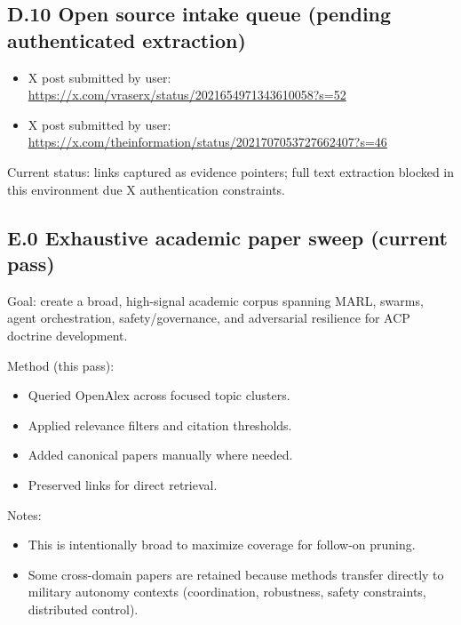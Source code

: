 \documentclass[
]{article}
\providecommand{\tightlist}{%
  \setlength{\itemsep}{0pt}\setlength{\parskip}{0pt}}
\begin{document}
\hypertarget{d.10-open-source-intake-queue-pending-authenticated-extraction}{%
\subsection{D.10 Open source intake queue (pending authenticated
extraction)}\label{d.10-open-source-intake-queue-pending-authenticated-extraction}}

\begin{itemize}
\tightlist
\item
  X post submitted by user:
  \url{https://x.com/vraserx/status/2021654971343610058?s=52}
\item
  X post submitted by user:
  \url{https://x.com/theinformation/status/2021707053727662407?s=46}
\end{itemize}

Current status: links captured as evidence pointers; full text
extraction blocked in this environment due X authentication constraints.

\hypertarget{e.0-exhaustive-academic-paper-sweep-current-pass}{%
\subsection{E.0 Exhaustive academic paper sweep (current
pass)}\label{e.0-exhaustive-academic-paper-sweep-current-pass}}

Goal: create a broad, high-signal academic corpus spanning MARL, swarms,
agent orchestration, safety/governance, and adversarial resilience for
ACP doctrine development.

Method (this pass):

\begin{itemize}
\tightlist
\item
  Queried OpenAlex across focused topic clusters.
\item
  Applied relevance filters and citation thresholds.
\item
  Added canonical papers manually where needed.
\item
  Preserved links for direct retrieval.
\end{itemize}

Notes:

\begin{itemize}
\tightlist
\item
  This is intentionally broad to maximize coverage for follow-on
  pruning.
\item
  Some cross-domain papers are retained because methods transfer
  directly to military autonomy contexts (coordination, robustness,
  safety constraints, distributed control).
\end{itemize}
\end{document}
